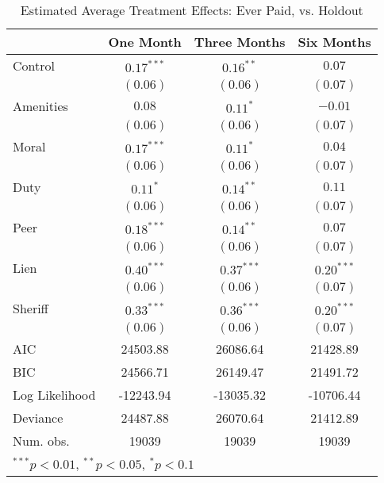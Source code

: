\documentclass[12pt,titlepage]{article}
\begin{document}
\begin{table}[htbp]
\caption{Estimated Average Treatment Effects: Ever Paid, vs. Holdout}
\begin{center}
\begin{tabular}{l c c c }
\hline
               & One Month & Three Months & Six Months \\
\hline
Control        & $0.17^{***}$ & $0.16^{**}$  & $0.07$       \\
               & $(0.06)$     & $(0.06)$     & $(0.07)$     \\
Amenities      & $0.08$       & $0.11^{*}$   & $-0.01$      \\
               & $(0.06)$     & $(0.06)$     & $(0.07)$     \\
Moral          & $0.17^{***}$ & $0.11^{*}$   & $0.04$       \\
               & $(0.06)$     & $(0.06)$     & $(0.07)$     \\
Duty           & $0.11^{*}$   & $0.14^{**}$  & $0.11$       \\
               & $(0.06)$     & $(0.06)$     & $(0.07)$     \\
Peer           & $0.18^{***}$ & $0.14^{**}$  & $0.07$       \\
               & $(0.06)$     & $(0.06)$     & $(0.07)$     \\
Lien           & $0.40^{***}$ & $0.37^{***}$ & $0.20^{***}$ \\
               & $(0.06)$     & $(0.06)$     & $(0.07)$     \\
Sheriff        & $0.33^{***}$ & $0.36^{***}$ & $0.20^{***}$ \\
               & $(0.06)$     & $(0.06)$     & $(0.07)$     \\
\hline
AIC            & 24503.88     & 26086.64     & 21428.89     \\
BIC            & 24566.71     & 26149.47     & 21491.72     \\
Log Likelihood & -12243.94    & -13035.32    & -10706.44    \\
Deviance       & 24487.88     & 26070.64     & 21412.89     \\
Num. obs.      & 19039        & 19039        & 19039        \\
\hline
\multicolumn{4}{l}{\scriptsize{$^{***}p<0.01$, $^{**}p<0.05$, $^*p<0.1$}}
\end{tabular}
\label{tbl:reg8_ep}
\end{center}
\end{table}
\end{document}
